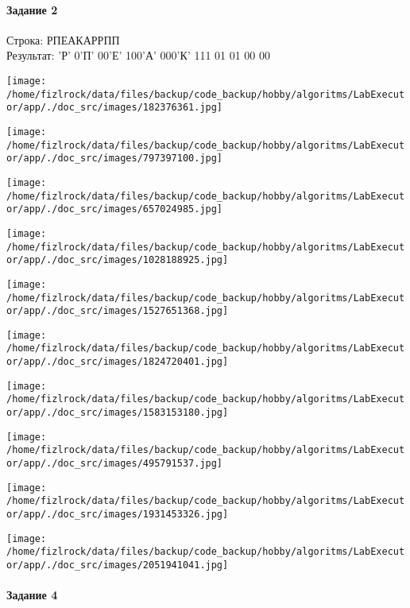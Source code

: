 \documentclass[a4paper, 12pt]{article}
\begin{document}
\paragraph{Задание 2}

Строка: 
РПЕАКАРРПП\\
Результат: 'Р' 0'П' 00'Е' 100'А' 000'К' 111 01 01 00 00

\texttt{[image: /home/fizlrock/data/files/backup/code\_backup/hobby/algoritms/LabExecutor/app/./doc\_src/images/182376361.jpg]}

\texttt{[image: /home/fizlrock/data/files/backup/code\_backup/hobby/algoritms/LabExecutor/app/./doc\_src/images/797397100.jpg]}

\texttt{[image: /home/fizlrock/data/files/backup/code\_backup/hobby/algoritms/LabExecutor/app/./doc\_src/images/657024985.jpg]}

\texttt{[image: /home/fizlrock/data/files/backup/code\_backup/hobby/algoritms/LabExecutor/app/./doc\_src/images/1028188925.jpg]}

\texttt{[image: /home/fizlrock/data/files/backup/code\_backup/hobby/algoritms/LabExecutor/app/./doc\_src/images/1527651368.jpg]}

\texttt{[image: /home/fizlrock/data/files/backup/code\_backup/hobby/algoritms/LabExecutor/app/./doc\_src/images/1824720401.jpg]}

\texttt{[image: /home/fizlrock/data/files/backup/code\_backup/hobby/algoritms/LabExecutor/app/./doc\_src/images/1583153180.jpg]}

\texttt{[image: /home/fizlrock/data/files/backup/code\_backup/hobby/algoritms/LabExecutor/app/./doc\_src/images/495791537.jpg]}

\texttt{[image: /home/fizlrock/data/files/backup/code\_backup/hobby/algoritms/LabExecutor/app/./doc\_src/images/1931453326.jpg]}

\texttt{[image: /home/fizlrock/data/files/backup/code\_backup/hobby/algoritms/LabExecutor/app/./doc\_src/images/2051941041.jpg]}
\pagebreak
\paragraph{Задание 4}
\end{document}
